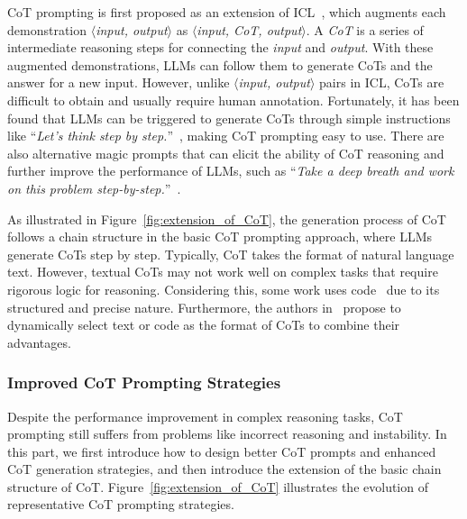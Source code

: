 CoT prompting is first proposed as an extension of ICL~\cite{Wei-arxiv-2022-chain}, which augments each demonstration $\langle$\emph{input, output}$\rangle$ as $\langle$\emph{input, CoT, output}$\rangle$.
A \textit{CoT} is a series of intermediate reasoning steps for connecting the \textit{input} and \textit{output}.
With these augmented demonstrations, LLMs can follow them to  %
{generate CoTs and the answer for a new input.} 
However, unlike $\langle$\emph{input, output}$\rangle$ pairs in ICL, CoTs are difficult to obtain and usually require human annotation.
Fortunately, it has been found that LLMs can be triggered to generate CoTs through simple instructions like ``\emph{Let's think step by step.}''~\cite{Kojima-arxiv-2022-Large}, making CoT prompting easy to use.
There are also alternative magic prompts that {can elicit the ability of CoT reasoning and further improve the performance of LLMs}, such as ``\emph{Take a deep breath and work on this problem step-by-step.}''~\cite{Yang-CoRR-2023-Large}.

{
As illustrated in Figure~\ref{fig:extension_of_CoT}, the generation process of CoT follows a chain structure in the basic CoT prompting approach, where LLMs generate CoTs step by step.
Typically, CoT takes the format of natural language text.
However, textual CoTs may not work well on complex tasks that require rigorous logic for reasoning.
Considering this, some work uses code~\cite{Chen-arxiv-2022-Program, Gao-ICML-2023-PAL} due to its structured and precise nature.
Furthermore, the authors in~\cite{Zhao-arxiv-2023-Automatic} propose to dynamically select text or code as the format of CoTs to combine their advantages.
}





\subsubsection{Improved CoT Prompting Strategies}

{
Despite the performance improvement in complex reasoning tasks, CoT prompting still suffers from problems like incorrect reasoning and instability.
In this part, we first introduce how to design better CoT prompts and enhanced CoT generation strategies, and then introduce the extension of the basic chain structure of CoT.
Figure~\ref{fig:extension_of_CoT} illustrates the evolution of representative CoT prompting strategies.
}

